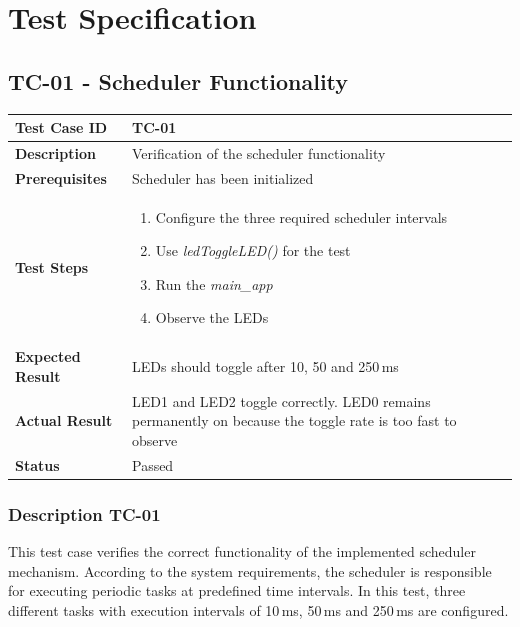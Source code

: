 \chapter{Test Specification}


\section{TC-01 - Scheduler Functionality}

\renewcommand{\arraystretch}{1.4}

\begin{table}[h]
\centering
\begin{tabular}{|p{}|p{}|}
\hline
\textbf{Test Case ID} & TC-01 \\ \hline
\textbf{Description} & Verification of the scheduler functionality \\ \hline
\textbf{Prerequisites} & Scheduler has been initialized \\ \hline
\textbf{Test Steps} &
\begin{enumerate}
\item Configure the three required scheduler intervals
\item Use \textit{ledToggleLED()} for the test
\item Run the \textit{main\_app}
\item Observe the LEDs
\end{enumerate}
\\ \hline
\textbf{Expected Result} & LEDs should toggle after 10, 50 and 250\,ms \\ \hline
\textbf{Actual Result} & LED1 and LED2 toggle correctly. LED0 remains permanently on because the toggle rate is too fast to observe \\ \hline
\textbf{Status} & \textcolor{green!60!black}{Passed} \\ \hline
\end{tabular}
\end{table}

\newpage
\subsection{Description TC-01}

This test case verifies the correct functionality of the implemented scheduler mechanism. 
According to the system requirements, the scheduler is responsible for executing periodic 
tasks at predefined time intervals. In this test, three different tasks with execution 
intervals of 10\,ms, 50\,ms and 250\,ms are configured.

